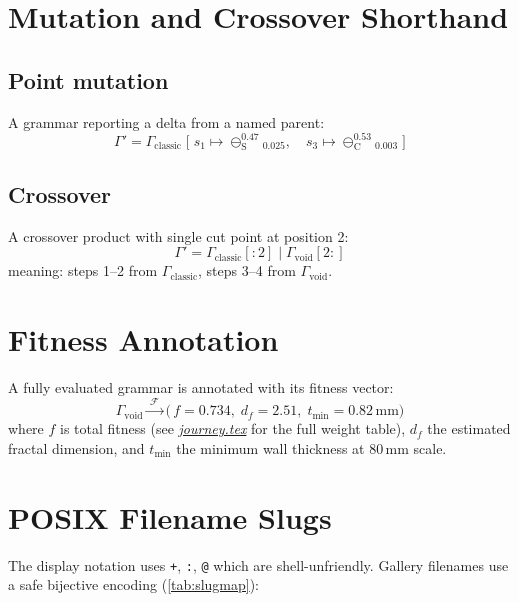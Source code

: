 \documentclass[11pt, a4paper]{article}
\newcommand{\prim}[1]{\mathrm{#1}}
\newcommand{\sub}{\ominus}
\newcommand{\code}[1]{\texttt{#1}}
\begin{document}
\section{Mutation and Crossover Shorthand}
\label{sec:mutation}

\subsection{Point mutation}
\label{subsec:point_mutation}

A grammar reporting a delta from a named parent:
\[
  \Gamma' = \Gamma_{\mathrm{classic}}
  \;\Big[\;
    s_1 \mapsto \sub_{\prim{S}}^{0.47}{}_{\!0.025},\quad
    s_3 \mapsto \sub_{\prim{C}}^{0.53}{}_{\!0.003}
  \;\Big]
\]

\subsection{Crossover}
\label{subsec:crossover}

A crossover product with single cut point at position 2:
\[
  \Gamma' = \Gamma_{\mathrm{classic}}[{:}2] \mathbin{|} \Gamma_{\mathrm{void}}[2{:}]
\]
meaning: steps 1--2 from $\Gamma_{\mathrm{classic}}$, steps 3--4 from
$\Gamma_{\mathrm{void}}$.

\section{Fitness Annotation}
\label{sec:fitness}

A fully evaluated grammar is annotated with its fitness vector:
\[
  \Gamma_{\mathrm{void}} \xrightarrow{\;\mathcal{F}\;}
  \bigl(\,f = 0.734,\; d_f = 2.51,\; t_{\min} = 0.82\,\mathrm{mm}\bigr)
\]
where $f$ is total fitness (see \href{journey.pdf}{\emph{journey.tex}} for
the full weight table), $d_f$ the estimated fractal dimension, and $t_{\min}$
the minimum wall thickness at $80\,\mathrm{mm}$ scale.

\section{POSIX Filename Slugs}
\label{sec:slugs}

The display notation uses \code{+}, \code{:}, \code{@} which are
shell-unfriendly. Gallery filenames use a safe bijective encoding
(\autoref{tab:slugmap}):
\end{document}
